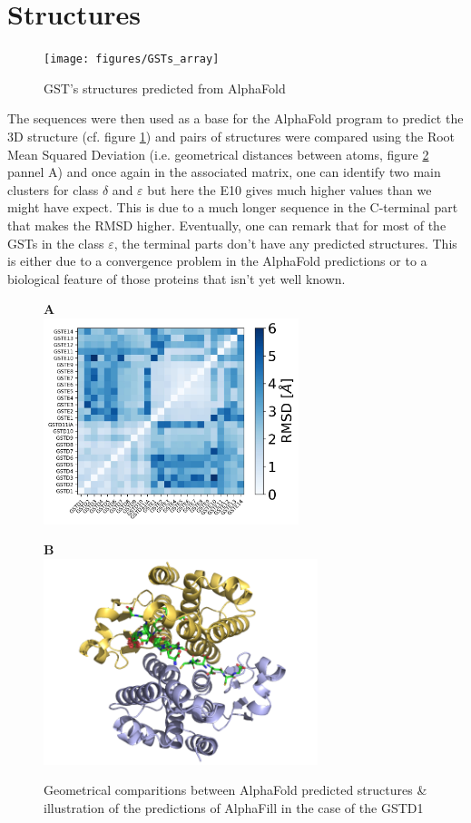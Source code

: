 \section{Structures}

\begin{figure}
	\label{AlphaFold structures}
	\texttt{[image: figures/GSTs\_array]}
	\caption{GST's structures predicted from AlphaFold}
\end{figure}

The sequences were then used as a base for the AlphaFold program to predict the 3D structure (cf. figure \ref{AlphaFold structures}) and pairs of structures were compared using the Root Mean Squared Deviation (i.e. geometrical distances between atoms, figure \ref{AlphaFill & GSHs} pannel A) and once again in the associated matrix, one can identify two main clusters for class $\delta$ and $\varepsilon$ but here the E10 gives much higher values than we might have expect. This is due to a much longer sequence in the C-terminal part that makes the RMSD higher. Eventually, one can remark that for most of the GSTs in the class $\varepsilon$, the terminal parts don't have any predicted structures. This is either due to a convergence problem in the AlphaFold predictions or to a biological feature of those proteins that isn't yet well known. 

\begin{figure}[H]
	\label{AlphaFill & GSHs}
	\begin{minipage}{.48\linewidth}
		\textbf{A}\\
		\includegraphics[height = 6cm]{figures/RMSD_matrix.jpg}
	\end{minipage}
	\begin{minipage}{.48\linewidth}
		\textbf{B}\\
		\includegraphics[height = 6cm]{figures/GSTD1_GSHs.png}
	\end{minipage}
	\caption{Geometrical comparitions between AlphaFold predicted structures \& illustration of the predictions of AlphaFill in the case of the GSTD1}
\end{figure}

